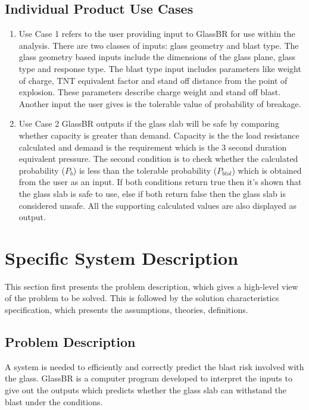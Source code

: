 \documentclass[12pt]{article}
\begin{document}
\subsection{Individual Product Use Cases}
\label{Sec:IPUC}
\begin{enumerate}
\item{Use Case 1 refers to the user providing input to GlassBR for use within the analysis. There are two classes of inputs: glass geometry and blast type. The glass geometry based inputs include the dimensions of the glass plane, glass type and response type. The blast type input includes parameters like weight of charge, TNT equivalent factor and stand off distance from the point of explosion. These parameters describe charge weight and stand off blast. Another input the user gives is the tolerable value of probability of breakage.}
\item{ Use Case 2 GlassBR outputs if the glass slab will be safe by comparing whether capacity is greater than demand. Capacity is the the load resistance calculated and demand is the requirement which is the 3 second duration equivalent pressure. The second condition is to check whether the calculated probability ($P_{b}$) is less than the tolerable probability ($P_{btol}$) which is obtained from the user as an input. If both conditions return true then it's shown that the glass slab is safe to use, else if both return false then the glass slab is considered unsafe. All the supporting calculated values are also displayed as output.}
\end{enumerate}
\section{Specific System Description}
\label{Sec:SSD}
This section first presents the problem description, which gives a high-level view of the problem to be solved. This is followed by the solution characteristics specification, which presents the assumptions, theories, definitions.
\subsection{Problem Description}
\label{Sec:PD}
A system is needed to efficiently and correctly predict the blast risk involved with the glass. GlassBR is a computer program developed to interpret the inputs to give out the outputs which predicts whether the glass slab can withstand the blast under the conditions.
\end{document}
